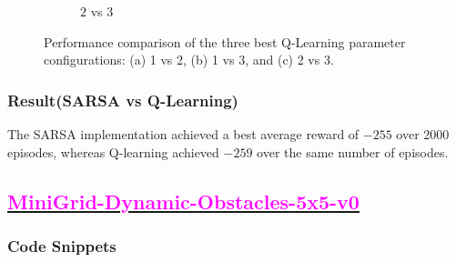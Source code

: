 \documentclass[11pt, a4]{article}
\begin{document}
\begin{figure}[H]
\begin{subfigure}{.8\textwidth}
						\caption{$2$ vs $3$}
						\label{fig:qlearningmountaincar2vs3}
					\end{subfigure}
					\caption{Performance comparison of the three best Q-Learning parameter configurations: (a) 1 vs 2, (b) 1 vs 3, and (c) 2 vs 3.}
					\label{fig:qlearningmountaincar}
				\end{figure}
			\subsubsection{Result(SARSA vs Q-Learning)}		
				The SARSA implementation achieved a best average reward of \(-255\) over 2000 episodes, whereas Q-learning achieved \(-259\) over the same number of episodes.
		\subsection{\href{https://github.com/RitabrataMandal/RL-DA6400-assignment_1/tree/main/minigrid_world}{\textcolor{magenta}{MiniGrid-Dynamic-Obstacles-5x5-v0}}}
			\subsubsection{Code Snippets}
				
				
				
				
\end{document}
